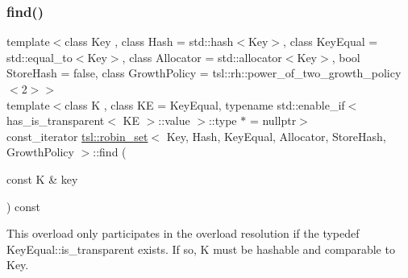 \subsubsection{\texorpdfstring{find()}{find()}\hspace{0.1cm}{\footnotesize\ttfamily [5/6]}}
{\footnotesize\ttfamily template$<$class Key , class Hash  = std\+::hash$<$\+Key$>$, class Key\+Equal  = std\+::equal\+\_\+to$<$\+Key$>$, class Allocator  = std\+::allocator$<$\+Key$>$, bool Store\+Hash = false, class Growth\+Policy  = tsl\+::rh\+::power\+\_\+of\+\_\+two\+\_\+growth\+\_\+policy$<$2$>$$>$ \\
template$<$class K , class KE  = Key\+Equal, typename std\+::enable\+\_\+if$<$ has\+\_\+is\+\_\+transparent$<$ K\+E $>$\+::value $>$\+::type $\ast$  = nullptr$>$ \\
const\+\_\+iterator \mbox{\hyperlink{classtsl_1_1robin__set}{tsl\+::robin\+\_\+set}}$<$ Key, Hash, Key\+Equal, Allocator, Store\+Hash, Growth\+Policy $>$\+::find (\begin{DoxyParamCaption}\item[{const K \&}]{key }\end{DoxyParamCaption}) const\hspace{0.3cm}{\ttfamily [inline]}}





This overload only participates in the overload resolution if the typedef Key\+Equal\+::is\+\_\+transparent exists. If so, K must be hashable and comparable to Key. \mbox{\label{classtsl_1_1robin__set_a22f4c432414bf50d914f382e4965a018}} 
